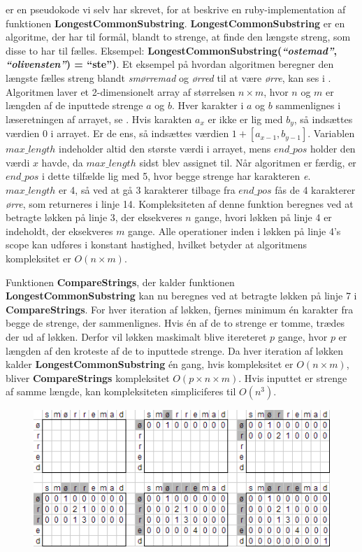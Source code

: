  er en pseudokode vi selv har skrevet, for at beskrive en ruby-implementation\cite{longestcommonsubstringrubywiki} af funktionen \textbf{LongestCommonSubstring}. \textbf{LongestCommonSubstring} er en algoritme, der har til formål, blandt to strenge, at finde den længste streng, som disse to har til fælles. Eksempel: \textbf{LongestCommonSubstring(\textit{``ostemad''}, \textit{``olivensten''}) = ``ste'')}. Et eksempel på hvordan algoritmen beregner den længste fælles streng blandt \textit{smørremad} og \textit{ørred} til at være \textit{ørre}, kan ses i .
Algoritmen laver et 2-dimensionelt array af størrelsen $n \times m$, hvor $n$ og $m$ er længden af de inputtede strenge $a$ og $b$. Hver karakter i $a$ og $b$ sammenlignes i læseretningen af arrayet, se . Hvis karakten $a_x$ er ikke er lig med $b_y$, så indsættes værdien 0 i arrayet. Er de ens, så indsættes værdien $1 + [a_{x-1}, b_{y-1}]$.
Variablen $max\_length$ indeholder altid den største værdi i arrayet, mens $end\_pos$ holder den værdi $x$ havde, da $max\_length$ sidst blev assignet til.
Når algoritmen er færdig, er $end\_pos$ i dette tilfælde lig med 5, hvor begge strenge har karakteren \textit{e}. $max\_length$ er 4, så ved at gå 3 karakterer tilbage fra $end\_pos$ fås de 4 karakterer \textit{ørre}, som returneres i linje 14. Kompleksiteten af denne funktion beregnes ved at betragte løkken på linje 3, der eksekveres $n$ gange, hvori løkken på linje 4 er indeholdt, der eksekveres $m$ gange. Alle operationer inden i løkken på linje 4's scope kan udføres i konstant hastighed, hvilket betyder at algoritmens kompleksitet er $O(n \times m)$.

Funktionen \textbf{CompareStrings}, der kalder funktionen \textbf{LongestCommonSubstring} kan nu beregnes ved at betragte løkken på linje 7 i \textbf{CompareStrings}. For hver iteration af løkken, fjernes minimum én karakter fra begge de strenge, der sammenlignes. Hvis én af de to strenge er tomme, trædes der ud af løkken. Derfor vil løkken maskimalt blive itereteret $p$ gange, hvor $p$ er længden af den kroteste af de to inputtede strenge.
Da hver iteration af løkken kalder \textbf{LongestCommonSubstring} én gang, hvis kompleksitet er $O(n \times m)$, bliver \textbf{CompareStrings} kompleksitet $O(p \times n \times m)$. Hvis inputtet er strenge af samme længde, kan kompleksiteten simpliciferes til $O(n^3)$.
\begin{figure}
\centering
\includegraphics[scale=0.6]{billeder/longest-common-substring.png}
  \label{fig:longest-common-substring}
\end{figure}

